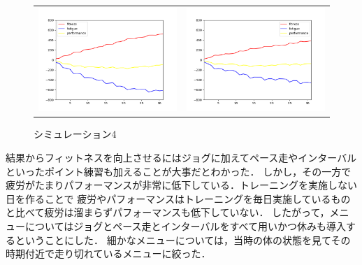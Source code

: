 \documentclass[12pt,fleqn]{jreport}
\begin{document}
\begin{figure}[H]
\begin{tabular}{cc}
\begin{minipage}[t]{0.45\hsize}
      \includegraphics[scale=0.5]{sim3.png}
      \caption{シミュレーション3}
    \end{minipage} &
    \begin{minipage}[t]{0.45\hsize}
      \centering
      \includegraphics[scale=0.5]{sim4.png}
      \caption{シミュレーション4}
    \end{minipage}   \\
  \end{tabular}
\end{figure}
\newpage
結果からフィットネスを向上させるにはジョグに加えてペース走やインターバルといったポイント練習も加えることが大事だとわかった．
しかし，その一方で疲労がたまりパフォーマンスが非常に低下している．トレーニングを実施しない日を作ることで
疲労やパフォーマンスはトレーニングを毎日実施しているものと比べて疲労は溜まらずパフォーマンスも低下していない．
したがって，メニューについてはジョグとペース走とインターバルをすべて用いかつ休みも導入するということにした．
細かなメニューについては，当時の体の状態を見てその時期付近で走り切れているメニューに絞った．
\end{document}
